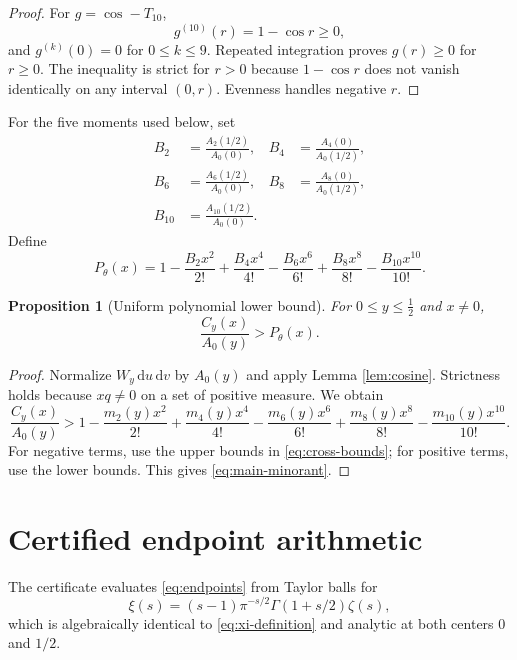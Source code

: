 \documentclass[11pt]{amsart}
\newtheorem{proposition}[theorem]{Proposition}
\theoremstyle{remark}
\newcommand{\dd}{\,\mathrm{d}}
\begin{document}
\begin{proof}
For $g=\cos-T_{10}$,
\[
g^{(10)}(r)=1-\cos r\geq0,
\]
and $g^{(k)}(0)=0$ for $0\leq k\leq9$.  Repeated integration proves
$g(r)\geq0$ for $r\geq0$.  The inequality is strict for $r>0$ because
$1-\cos r$ does not vanish identically on any interval $(0,r)$.  Evenness
handles negative $r$.
\end{proof}

For the five moments used below, set
\begin{equation}\label{eq:B}
\begin{aligned}
B_2&=\frac{A_2(1/2)}{A_0(0)},&
B_4&=\frac{A_4(0)}{A_0(1/2)},\\
B_6&=\frac{A_6(1/2)}{A_0(0)},&
B_8&=\frac{A_8(0)}{A_0(1/2)},\\
B_{10}&=\frac{A_{10}(1/2)}{A_0(0)}.
\end{aligned}
\end{equation}
Define
\begin{equation}\label{eq:Ptheta}
P_\theta(x)=
1-\frac{B_2x^2}{2!}+\frac{B_4x^4}{4!}
-\frac{B_6x^6}{6!}+\frac{B_8x^8}{8!}
-\frac{B_{10}x^{10}}{10!}.
\end{equation}

\begin{proposition}[Uniform polynomial lower bound]\label{prop:minorant}
For $0\leq y\leq\frac12$ and $x\neq0$,
\begin{equation}\label{eq:main-minorant}
\frac{C_y(x)}{A_0(y)}>P_\theta(x).
\end{equation}
\end{proposition}

\begin{proof}
Normalize $W_y\dd u\dd v$ by $A_0(y)$ and apply Lemma
\ref{lem:cosine}.  Strictness holds because $xq\neq0$ on a set of positive
measure.  We obtain
\[
\frac{C_y(x)}{A_0(y)}>
1-\frac{m_2(y)x^2}{2!}+\frac{m_4(y)x^4}{4!}
-\frac{m_6(y)x^6}{6!}+\frac{m_8(y)x^8}{8!}
-\frac{m_{10}(y)x^{10}}{10!}.
\]
For negative terms, use the upper bounds in \eqref{eq:cross-bounds}; for
positive terms, use the lower bounds.  This gives \eqref{eq:main-minorant}.
\end{proof}

\section{Certified endpoint arithmetic}

The certificate evaluates \eqref{eq:endpoints} from Taylor balls for
\begin{equation}\label{eq:xi-computational}
\xi(s)=(s-1)\pi^{-s/2}\Gamma(1+s/2)\zeta(s),
\end{equation}
which is algebraically identical to \eqref{eq:xi-definition} and analytic at
both centers $0$ and $1/2$.
\end{document}
